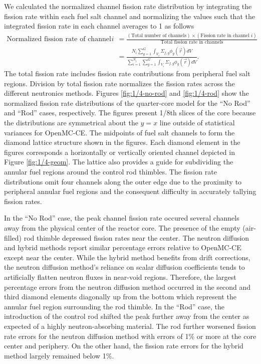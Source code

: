 We calculated the normalized channel fission rate distribution by integrating the fission rate
within each fuel salt channel and normalizing the values such that the integrated fission rate in
each channel averages to 1 as follows
%
\begin{align}
  \text{Normalized fission rate of channel }i &= \frac{(\text{Total number of channels})\times
    (\text{Fission rate in channel }i)}{\text{Total fission rate in channels}} \nonumber \\
                                              &= \frac{N_i\sum^G_{g=1}\int_{V_i}\Sigma_{f,g}
  \phi_g(\vec{r}) dV}{
  \sum^{N_i}_{i=1}\sum^G_{g=1}\int_{V_i}\Sigma_{f,g}\phi_g(\vec{r}) dV}.
\end{align}
%
The total fission rate includes fission rate contributions from peripheral fuel salt regions.
Division by total fission rate normalizes the fission rates across the different neutronics
methods.
Figures \ref{fig:1/4-no-rod} and \ref{fig:1/4-rod} show the normalized fission rate distributions
of the quarter-core model for the ``No Rod'' and ``Rod'' cases, respectively. The figures present
1/8th slices of the core because the distributions are symmetrical about the $y=x$ line
outside of statistical variances for OpenMC-CE. The midpoints of fuel salt channels to form the
diamond lattice structure shown in the figures.
Each diamond element in the figures corresponds a horizontally or vertically oriented channel
depicted in Figure \ref{fig:1/4-geom}. The lattice also provides a guide for subdividing the
annular fuel regions around the control rod thimbles. The fission rate
distributions omit four channels along the outer edge due to the proximity to peripheral annular
fuel regions and the consequent difficulty in accurately tallying fission rates.

In the ``No Rod'' case, the peak channel fission rate occured several channels away from the
physical center of the reactor core. The presence of the empty (air-filled) rod thimble depressed
fission rates near the center. The neutron diffusion and hybrid methods report similar percentage
errors relative to OpenMC-CE except near the center. While the hybrid method benefits from drift
corrections, the neutron diffusion method's reliance on scalar diffusion coefficients tends to
artificially flatten neutron fluxes in near-void regions. Therefore, the largest percentage errors
from the neutron diffusion method occurred in the second and third diamond elements
diagonally up from the bottom which represent the annular fuel region surrounding the rod thimble.
In the ``Rod'' case, the introduction of the control rod shifted the peak further away from the
center as expected of a highly neutron-absorbing material. The rod further worsened fission rate
errors for the neutron diffusion method with errors of 1\% or more at the core center and
periphery. On the other hand, the fission rate errors for the hybrid method largely remained below
1\%.

